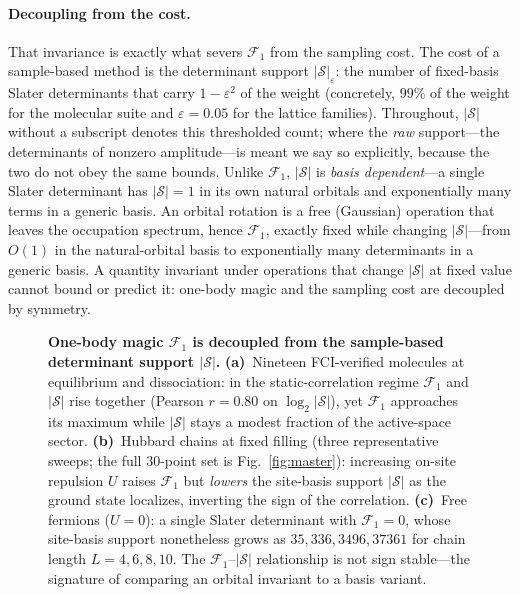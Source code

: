 \paragraph{Decoupling from the cost.} That invariance is exactly what severs $\mathcal F_1$ from the
sampling cost. The cost of a sample-based method is the determinant support $|\mathcal S|_\varepsilon$:
the number of fixed-basis Slater determinants that carry $1-\varepsilon^2$ of the weight (concretely,
$99\%$ of the weight for the molecular suite and $\varepsilon=0.05$ for the lattice families). Throughout,
$|\mathcal S|$ without a subscript denotes this thresholded count; where the \emph{raw} support---the
determinants of nonzero amplitude---is meant we say so explicitly, because the two do not obey the same
bounds. Unlike
$\mathcal F_1$, $|\mathcal S|$ is \emph{basis dependent}---a single Slater determinant has
$|\mathcal S|=1$ in its own natural orbitals and exponentially many terms in a generic basis. An
orbital rotation is a free (Gaussian) operation that leaves the occupation spectrum, hence
$\mathcal F_1$, exactly fixed while changing $|\mathcal S|$---from $O(1)$ in the natural-orbital basis to
exponentially many determinants in a generic basis. A quantity invariant under operations that change
$|\mathcal S|$ at fixed value cannot bound or predict it: one-body magic and the sampling cost are
decoupled by symmetry.

\begin{figure}[t]\centering

\caption{\label{fig:decoupling}\textbf{One-body magic $\mathcal F_1$ is decoupled from the sample-based
determinant support $|\mathcal S|$.} \textbf{(a)}~Nineteen FCI-verified molecules at equilibrium and
dissociation: in the static-correlation regime $\mathcal F_1$ and $|\mathcal S|$ rise together
(Pearson $r=0.80$ on $\log_2|\mathcal S|$), yet $\mathcal F_1$ approaches its maximum while
$|\mathcal S|$ stays a modest fraction of the active-space sector. \textbf{(b)}~Hubbard chains at fixed
filling (three representative sweeps; the full $30$-point set is Fig.~\ref{fig:master}): increasing on-site repulsion $U$ raises $\mathcal F_1$ but \emph{lowers} the site-basis
support $|\mathcal S|$ as the ground state localizes, inverting the sign of the correlation.
\textbf{(c)}~Free fermions ($U=0$): a single Slater determinant with $\mathcal F_1=0$, whose site-basis
support nonetheless grows as $35,336,3496,37361$ for chain length $L=4,6,8,10$. The
$\mathcal F_1$--$|\mathcal S|$ relationship is not sign stable---the signature of comparing an
orbital invariant to a basis variant.}
\end{figure}

